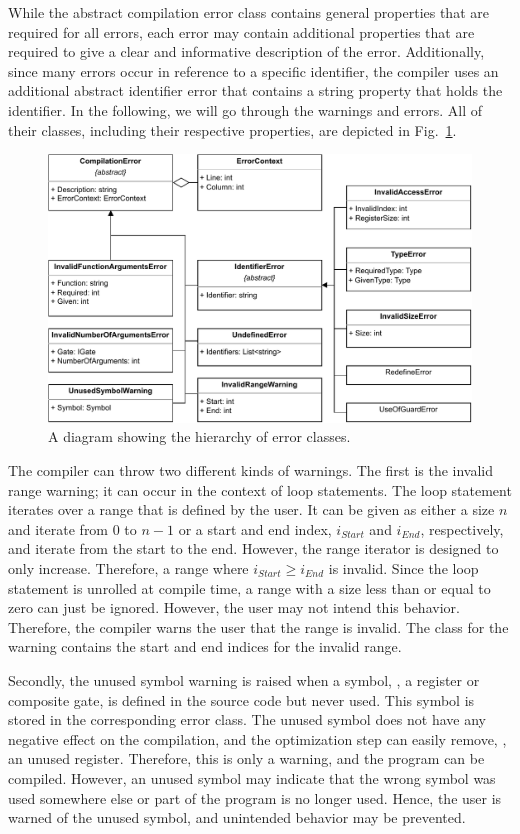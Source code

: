 While the abstract compilation error class contains general properties that are required for all errors, each error may contain additional properties that are required to give a clear and informative description of the error. Additionally, since many errors occur in reference to a specific identifier, the compiler uses an additional abstract identifier error that contains a string property that holds the identifier. In the following, we will go through the warnings and errors. All of their classes, including their respective properties, are depicted in Fig.~\ref{fig:implementation_uml_errors}.

\begin{figure}[htp]
    \centering
    \includegraphics[width=.9\textwidth]{../figures/drawio/uml_errors.pdf}
    \caption{A diagram showing the hierarchy of error classes.}
    \label{fig:implementation_uml_errors}
\end{figure}

The compiler can throw two different kinds of warnings. The first is the invalid range warning; it can occur in the context of loop statements. The loop statement iterates over a range that is defined by the user. It can be given as either a size $n$ and iterate from $0$ to $n-1$ or a start and end index, $i_{Start}$ and $i_{End}$, respectively, and iterate from the start to the end. However, the range iterator is designed to only increase. Therefore, a range where $i_{Start} \geq i_{End}$ is invalid. Since the loop statement is unrolled at compile time, a range with a size less than or equal to zero can just be ignored. However, the user may not intend this behavior. Therefore, the compiler warns the user that the range is invalid. The class for the warning contains the start and end indices for the invalid range.

Secondly, the unused symbol warning is raised when a symbol, \eg, a register or composite gate, is defined in the source code but never used. This symbol is stored in the corresponding error class. The unused symbol does not have any negative effect on the compilation, and the optimization step can easily remove, \eg, an unused register. Therefore, this is only a warning, and the program can be compiled. However, an unused symbol may indicate that the wrong symbol was used somewhere else or part of the program is no longer used. Hence, the user is warned of the unused symbol, and unintended behavior may be prevented.

